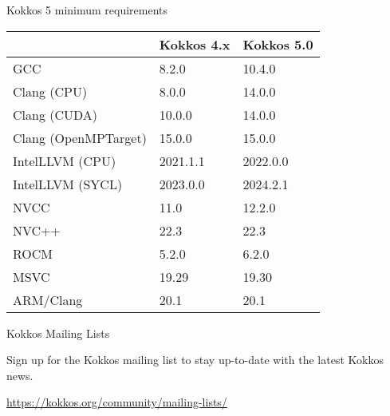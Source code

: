 \begin{frame}[fragile]{Kokkos 5 minimum requirements}

\begin{table}[]
\begin{tabular}{lll}
\multicolumn{1}{r}{} & Kokkos 4.x & Kokkos 5.0 \\ \hline
GCC                  & 8.2.0      & 10.4.0     \\
Clang (CPU)          & 8.0.0      & 14.0.0     \\
Clang (CUDA)         & 10.0.0     & 14.0.0     \\
Clang (OpenMPTarget) & 15.0.0     & 15.0.0     \\
IntelLLVM (CPU)      & 2021.1.1   & 2022.0.0   \\
IntelLLVM (SYCL)     & 2023.0.0   & 2024.2.1   \\
NVCC                 & 11.0       & 12.2.0     \\
NVC++                & 22.3       & 22.3       \\
ROCM                 & 5.2.0      & 6.2.0      \\
MSVC                 & 19.29      & 19.30      \\
ARM/Clang            & 20.1       & 20.1       \\ \hline
\end{tabular}
\end{table}

\end{frame}


\begin{frame}[fragile]{Kokkos Mailing Lists}

\vspace{0.5cm}
\begin{center}
Sign up for the Kokkos mailing list to stay up-to-date with the latest Kokkos news.
\end{center}

\vspace{0.5cm}

\begin{center}
\url{https://kokkos.org/community/mailing-lists/}
\end{center}

\end{frame}

